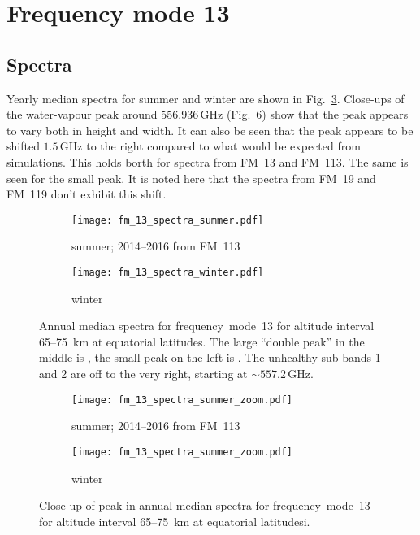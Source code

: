 \section{Frequency mode 13}
\label{FM13}

\subsection{Spectra}
\label{FM13:spectra}
Yearly median spectra for summer and winter are shown in
Fig.~\ref{fig:spectra:13}. Close-ups of the water-vapour peak around
$556.936\,\mathrm{GHz}$ (Fig.~\ref{fig:spectra:13:closeup}) show that the peak
appears to vary both in height and width. It can also be seen that the peak
appears to be shifted $1.5\,\mathrm{GHz}$ to the right compared to what would
be expected from simulations. This holds borth for spectra from FM~13 and
FM~113. The same is seen for the small  peak. It is noted here that the spectra from FM~19 and FM~119 don't
exhibit this shift.


\begin{figure}[h]
    \centering
    \begin{subfigure}[b]{0.9545\textwidth}
        \texttt{[image: fm\_13\_spectra\_summer.pdf]}
        \caption{summer; 2014--2016 from FM~113}\label{fig:spectra:13:summer}
    \end{subfigure}
    \begin{subfigure}[b]{0.9545\textwidth}
        \texttt{[image: fm\_13\_spectra\_winter.pdf]}
        \caption{winter}\label{fig:spectra:13:winter}
    \end{subfigure}
    \caption{Annual median spectra for frequency~mode~13 for altitude
        interval 65--75~km at equatorial latitudes. The large ``double peak''
        in the middle is , the small peak on the left is
        . The unhealthy sub-bands 1 and 2 are off to the very right,
        starting at $\sim557.2\,\mathrm{GHz}$.}\label{fig:spectra:13}
\end{figure}

\begin{figure}[h]
    \centering
    \begin{subfigure}[b]{0.9545\textwidth}
        \texttt{[image: fm\_13\_spectra\_summer\_zoom.pdf]}
        \caption{summer; 2014--2016 from
            FM~113}\label{fig:spectra:13:summer:closeup}
    \end{subfigure}
    \begin{subfigure}[b]{0.9545\textwidth}
        \texttt{[image: fm\_13\_spectra\_summer\_zoom.pdf]}
        \caption{winter}\label{fig:spectra:13:winter:closeup}
    \end{subfigure}
    \caption{Close-up of  peak in annual median spectra for
        frequency~mode~13 for altitude interval 65--75~km at equatorial
        latitudesi.}\label{fig:spectra:13:closeup}
\end{figure}


